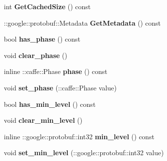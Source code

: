 \begin{DoxyCompactItemize}
int {\bfseries Get\+Cached\+Size} () const
\item 
\mbox{\label{classcaffe_1_1_net_state_rule_a7df19c145e9d57f2f9ba68f6ecb3a895}} 
\+::google\+::protobuf\+::\+Metadata {\bfseries Get\+Metadata} () const
\item 
\mbox{\label{classcaffe_1_1_net_state_rule_a05eac3b9c51afcddab9a4f6044cfb0d2}} 
bool {\bfseries has\+\_\+phase} () const
\item 
\mbox{\label{classcaffe_1_1_net_state_rule_adba1858c502a2ac63e747800de6a76fb}} 
void {\bfseries clear\+\_\+phase} ()
\item 
\mbox{\label{classcaffe_1_1_net_state_rule_a98e65812d1a2253d63189e4a59780345}} 
inline \+::caffe\+::\+Phase {\bfseries phase} () const
\item 
\mbox{\label{classcaffe_1_1_net_state_rule_af6d1805f70654c431baa35eeadf70d79}} 
void {\bfseries set\+\_\+phase} (\+::caffe\+::\+Phase value)
\item 
\mbox{\label{classcaffe_1_1_net_state_rule_a52da8aa2c66b9eb67773ea50dd716240}} 
bool {\bfseries has\+\_\+min\+\_\+level} () const
\item 
\mbox{\label{classcaffe_1_1_net_state_rule_a99daec36c4dc057e0acc095bc0cf52d9}} 
void {\bfseries clear\+\_\+min\+\_\+level} ()
\item 
\mbox{\label{classcaffe_1_1_net_state_rule_a884ac12043e846c839214023571c6407}} 
inline \+::google\+::protobuf\+::int32 {\bfseries min\+\_\+level} () const
\item 
\mbox{\label{classcaffe_1_1_net_state_rule_ae2bc06265734285e649e9dab4d94c329}} 
void {\bfseries set\+\_\+min\+\_\+level} (\+::google\+::protobuf\+::int32 value)
\item 
\mbox{\label{classcaffe_1_1_net_state_rule_a7efd5d3decc706fa64fd2ecacb53f46c}} 

\end{DoxyCompactItemize}
